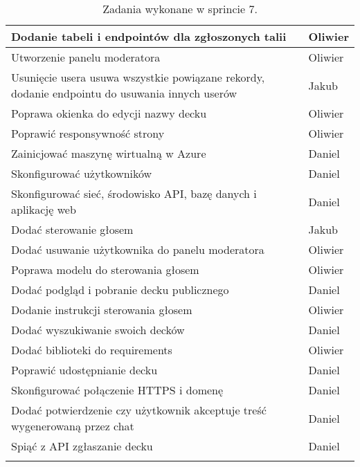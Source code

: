 \begin{longtable}{|p{}|p{}|}
    \hline
    [BACKEND] Dodanie tabeli i endpointów dla zgłoszonych talii & Oliwier \\
    \hline
    [WEB] Utworzenie panelu moderatora & Oliwier \\
    \hline
    [BACKEND] Usunięcie usera usuwa wszystkie powiązane rekordy, dodanie endpointu do usuwania innych userów & Jakub \\
    \hline
    [WEB] Poprawa okienka do edycji nazwy decku & Oliwier \\
    \hline
    [WEB] Poprawić responsywność strony & Oliwier \\
    \hline
    [SERWER] Zainicjować maszynę wirtualną w Azure & Daniel \\
    \hline
    [SERWER] Skonfigurować użytkowników & Daniel \\
    \hline
    [SERWER] Skonfigurować sieć, środowisko API, bazę danych i aplikację web & Daniel \\
    \hline
    [MOBILE] Dodać sterowanie głosem & Jakub \\
    \hline
    [WEB] Dodać usuwanie użytkownika do panelu moderatora & Oliwier \\
    \hline
    [BACKEND] Poprawa modelu do sterowania głosem & Oliwier \\
    \hline
    [MOBILE] Dodać podgląd i pobranie decku publicznego & Daniel \\
    \hline
    [WEB] Dodanie instrukcji sterowania głosem & Oliwier \\
    \hline
    [MOBILE] Dodać wyszukiwanie swoich decków & Daniel \\
    \hline
    [BACKEND] Dodać biblioteki do requirements & Oliwier \\
    \hline
    [MOBILE] Poprawić udostępnianie decku & Daniel \\
    \hline
    [SERWER] Skonfigurować połączenie HTTPS i domenę & Daniel \\
    \hline
    [MOBILE] Dodać potwierdzenie czy użytkownik akceptuje treść wygenerowaną przez chat & Daniel \\
    \hline
    [MOBILE] Spiąć z API zgłaszanie decku & Daniel \\
    \hline
                        \caption{Zadania wykonane w sprincie 7.}
\end{longtable}

